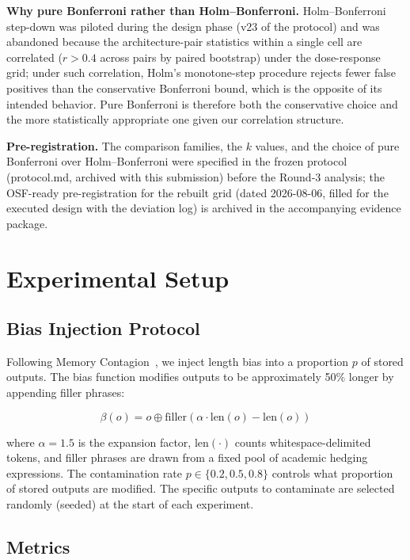 \documentclass[11pt]{article}
\begin{document}
\textbf{Why pure Bonferroni rather than Holm--Bonferroni.} Holm--Bonferroni step-down was piloted during the design phase (v23 of the protocol) and was abandoned because the architecture-pair statistics within a single cell are correlated ($r > 0.4$ across pairs by paired bootstrap) under the dose-response grid; under such correlation, Holm's monotone-step procedure rejects fewer false positives than the conservative Bonferroni bound, which is the opposite of its intended behavior. Pure Bonferroni is therefore both the conservative choice and the more statistically appropriate one given our correlation structure.

\textbf{Pre-registration.} The comparison families, the $k$ values, and the choice of pure Bonferroni over Holm--Bonferroni were specified in the frozen protocol (protocol.md, archived with this submission) before the Round-3 analysis; the OSF-ready pre-registration for the rebuilt grid (dated 2026-08-06, filled for the executed design with the deviation log) is archived in the accompanying evidence package.


\section{Experimental Setup}
\label{sec:experimental-setup}

\subsection{Bias Injection Protocol}

Following Memory Contagion~\cite{liu2026memorycontagion}, we inject length bias into a proportion $p$ of stored outputs. The bias function modifies outputs to be approximately 50\% longer by appending filler phrases:

\begin{equation}
\beta(o) = o \oplus \text{filler}(\alpha \cdot \text{len}(o) - \text{len}(o))
\end{equation}

where $\alpha = 1.5$ is the expansion factor, $\text{len}(\cdot)$ counts whitespace-delimited tokens, and filler phrases are drawn from a fixed pool of academic hedging expressions. The contamination rate $p \in \{0.2, 0.5, 0.8\}$ controls what proportion of stored outputs are modified. The specific outputs to contaminate are selected randomly (seeded) at the start of each experiment.

\subsection{Metrics}
\end{document}
